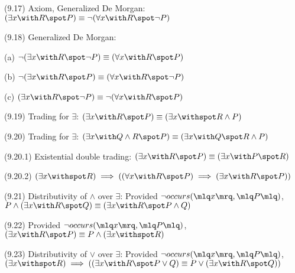 \documentclass[a4paper,10pt]{article}
\newenvironment{theoremlist}{
\begin{description}
  \setlength{\itemsep}{1.5pt}
  \setlength{\parskip}{0pt}
  \setlength{\parsep}{0pt}
}{\end{description}}
\begin{document}
\begin{theoremlist}
\item[(9.17) Axiom, Generalized De Morgan:]					$ (\exists x \with R \spot P) \equiv \lnot (\forall x \with R \spot \lnot P) $
\item[(9.18) Generalized De Morgan:]
  \begin{theoremlist}
  \item %
  \item[(a)]									$ \lnot (\exists x \with R \spot \lnot P) \equiv (\forall x \with R \spot P) $
  \item[(b)] 									$ \lnot (\exists x \with R \spot P) \equiv (\forall x \with R \spot \lnot P) $
  \item[(c)] 									$ (\exists x \with R \spot \lnot P) \equiv \lnot(\forall x \with R \spot P) $
  \end{theoremlist}
\item[(9.19) Trading for $\exists$:]						$ (\exists x \with R \spot P) \equiv (\exists x \withspot R \land P) $
\item[(9.20) Trading for $\exists$:]						$ (\exists x \with Q \land R \spot P) \equiv (\exists x \with Q \spot R \land P) $
\item[(9.20.1) Existential double trading:]					$ (\exists x \with R \spot P) \equiv (\exists x \with P \spot R) $
\item[(9.20.2)]									$ (\exists x \withspot R) \implies ((\forall x \with R \spot P) \implies (\exists x \with R \spot P)) $

\item[(9.21) Distributivity of $\land$ over $\exists$:]				Provided $ \lnot occurs (\mlq x \mrq, \mlq P \mlq)$,\newline
										$ P \land (\exists x \with R \spot Q) \equiv (\exists x \with R \spot P \land Q) $

\item[(9.22)]									Provided $ \lnot occurs (\mlq x \mrq, \mlq P \mlq)$,
										$ (\exists x \with R \spot P) \equiv P \land (\exists x \withspot R) $

\item[(9.23) Distributivity of $\lor$ over $\exists$:]				Provided $ \lnot occurs (\mlq x \mrq, \mlq P \mlq)$,\newline
										$ (\exists x \withspot R) \implies ((\exists x \with R \spot P \lor Q) \equiv P \lor (\exists x \with R \spot Q)) $


\end{theoremlist}
\end{document}
